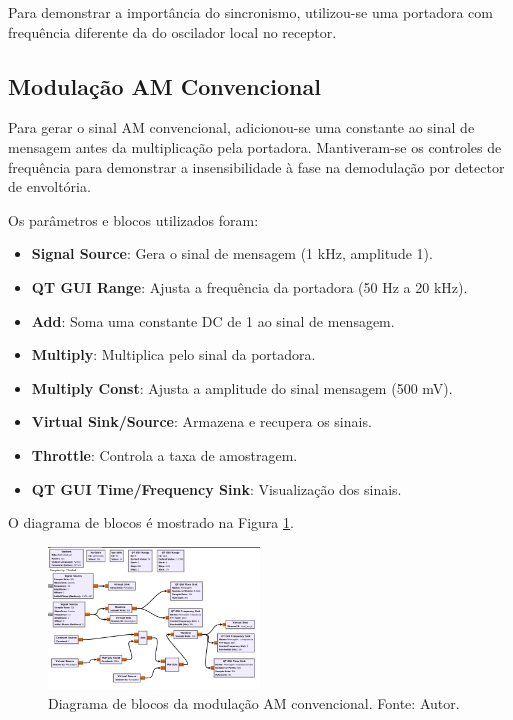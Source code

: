 Para demonstrar a importância do sincronismo, utilizou-se uma portadora com frequência diferente da do oscilador local no receptor.

\subsection{Modulação AM Convencional}

Para gerar o sinal AM convencional, adicionou-se uma constante ao sinal de mensagem antes da multiplicação pela portadora. Mantiveram-se os controles de frequência para demonstrar a insensibilidade à fase na demodulação por detector de envoltória.

Os parâmetros e blocos utilizados foram:

\begin{itemize}
    \item \textbf{Signal Source}: Gera o sinal de mensagem (1 kHz, amplitude 1).
    \item \textbf{QT GUI Range}: Ajusta a frequência da portadora (50 Hz a 20 kHz).
    \item \textbf{Add}: Soma uma constante DC de 1 ao sinal de mensagem.
    \item \textbf{Multiply}: Multiplica pelo sinal da portadora.
    \item \textbf{Multiply Const}: Ajusta a amplitude do sinal mensagem (500 mV).
    \item \textbf{Virtual Sink/Source}: Armazena e recupera os sinais.
    \item \textbf{Throttle}: Controla a taxa de amostragem.
    \item \textbf{QT GUI Time/Frequency Sink}: Visualização dos sinais.
\end{itemize}

O diagrama de blocos é mostrado na Figura \ref{fig:modulacao_am_gnu}.

\begin{figure}
    \centering
    \includegraphics[width=0.5\textwidth]{images/convecional_gnu.png}
    \caption{Diagrama de blocos da modulação AM convencional. Fonte: Autor.}
    \label{fig:modulacao_am_gnu}
\end{figure}


